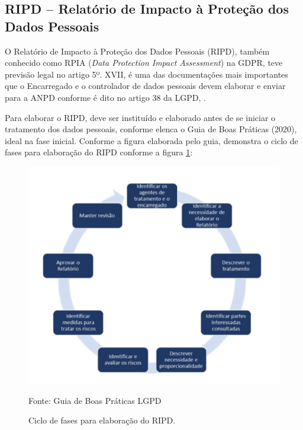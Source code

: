 \documentclass[
	12pt,				%
	openright,			%
	oneside,			%
	a4paper,			%
	english,			%
	french,				%
	spanish,			%
	brazil,				%
	]{abntex2}
\begin{document}
\subsection{ RIPD – Relatório de Impacto à Proteção dos Dados Pessoais  }

O Relatório de Impacto à Proteção dos Dados Pessoais (RIPD), também conhecido como RPIA (\textit{Data Protection Impact Assessment}) na GDPR, teve previsão legal no artigo 5º. XVII, é uma das documentações mais importantes que o Encarregado e o controlador de dados pessoais devem elaborar e enviar para a ANPD conforme é dito no artigo 38 da LGPD, \cite{01-01-LeiGeral}.

Para elaborar o RIPD, deve ser instituído e elaborado antes de se iniciar o tratamento dos dados pessoais, conforme elenca o Guia de Boas Práticas (2020), ideal na fase inicial. Conforme a figura elaborada pelo guia, demonstra o ciclo de fases para elaboração do RIPD conforme a figura \ref{fig: CicloRIPD }:
\begin{figure}[ht]
    \centering
    \caption{Ciclo de fases para elaboração do RIPD.}
    \includegraphics[width=5.5in]{Images/07CicloRIPD.png}
    \label{fig: CicloRIPD }
    
    \centering \small Fonte: Guia de Boas Práticas LGPD
\end{figure}


\end{document}
